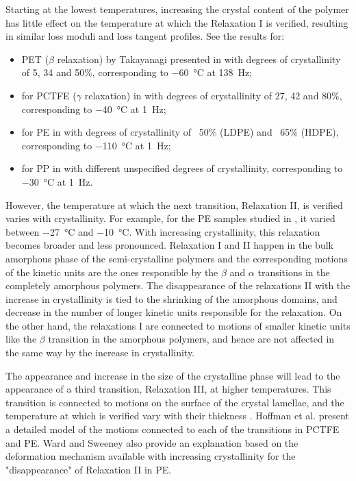 Starting at the lowest temperatures, increasing the crystal content of the polymer has little effect on the temperature at which the Relaxation I is verified, resulting in similar loss moduli and loss tangent profiles.
See the results for:
\begin{itemize}
	\item PET ($\beta$ relaxation) by Takayanagi presented in \cite{wardIntroductionMechanicalProperties2004} with degrees of crystallinity of 5, 34 and 50\%, corresponding to \SI{-60}{\celsius} at \SI{138}{\hertz};
	\item for PCTFE ($\gamma$ relaxation) in \cite{mccrumVariationInternalFriction1962} with degrees of crystallinity of 27, 42 and 80\%, corresponding to \SI{-40}{\celsius} at \SI{1}{\hertz};
	\item for PE in \cite{khannaDynamicMechanicalRelaxations1985} with degrees of crystallinity of ~50\% (LDPE) and ~65\% (HDPE), corresponding to \SI{-110}{\celsius} at \SI{1}{\hertz};
	\item for PP in \cite{mccrumStudyInternalFriction1959} with different unspecified degrees of crystallinity, corresponding to \SI{-30}{\celsius} at \SI{1}{\hertz}.
\end{itemize}

However, the temperature at which the next transition, Relaxation II, is verified varies with crystallinity.
For example, for the PE samples studied in \cite{khannaDynamicMechanicalRelaxations1985}, it varied between \SI{-27}{\celsius} and \SI{-10}{\celsius}.
With increasing crystallinity, this relaxation becomes broader and less pronounced.
Relaxation I and II happen in the bulk amorphous phase of the semi-crystalline polymers and the corresponding motions of the kinetic units are the ones responsible by the $\beta$ and $\alpha$ transitions in the completely amorphous polymers.
The disappearance of the relaxations II with the increase in crystallinity is tied to the shrinking of the amorphous domains, and decrease in the number of longer kinetic units responsible for the relaxation.
On the other hand, the relaxations I are connected to motions of smaller kinetic units like the $\beta$ transition in the amorphous polymers, and hence are not affected in the same way by the increase in crystallinity.

The appearance and increase in the size of the crystalline phase will lead to the appearance of a third transition, Relaxation III, at higher temperatures.
This transition is connected to motions on the surface of the crystal lamellae, and the temperature at which is verified vary with their thickness \citep{khannaDynamicMechanicalRelaxations1985, hoffmanAnalysisRelaxationsPolychlorotrifluoroethylene2007}.
Hoffman et al. \citep{hoffmanAnalysisRelaxationsPolychlorotrifluoroethylene2007} present a detailed model of the motions connected to each of the transitions in PCTFE and PE.
Ward and Sweeney \citep{wardIntroductionMechanicalProperties2004} also provide an explanation based on the deformation mechanism available with increasing crystallinity for the "disappearance" of Relaxation II in PE.


